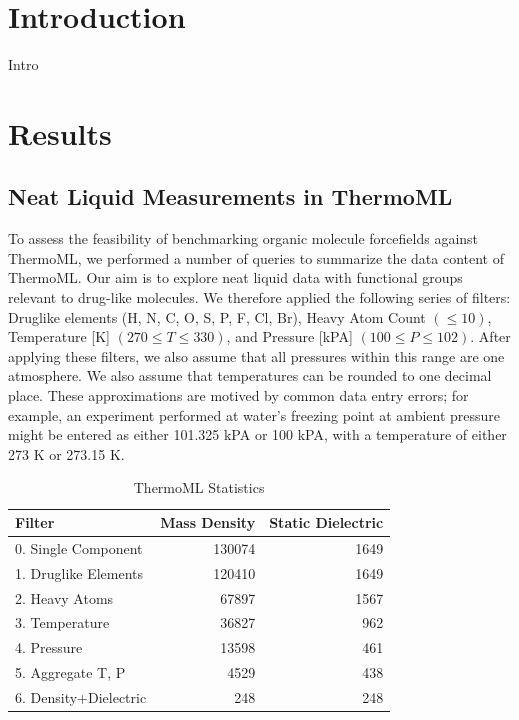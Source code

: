 \documentclass[aps,pre,twocolumn,superscriptaddress]{revtex4-1}
\begin{document}
\section{Introduction}

Intro

\section{Results}

\subsection{Neat Liquid Measurements in ThermoML}

To assess the feasibility of benchmarking organic molecule forcefields against ThermoML, we performed a number of queries to summarize the data content of ThermoML.  Our aim is to explore neat liquid data with functional groups relevant to drug-like molecules.  We therefore applied the following series of filters: Druglike elements (H, N, C, O, S, P, F, Cl, Br), Heavy Atom Count $(\le 10)$, Temperature [K] $(270 \le T \le 330)$, and Pressure [kPA] $(100 \le P \le 102)$.  After applying these filters, we also assume that all pressures within this range are one atmosphere.  We also assume that temperatures can be rounded to one decimal place.  These approximations are motived by common data entry errors; for example, an experiment performed at water's freezing point at ambient pressure might be entered as either 101.325 kPA or 100 kPA, with a temperature of either 273 K or 273.15 K.

\begin{table}
\begin{tabular}{lrr}
\toprule
Filter &  Mass Density &  Static Dielectric \\
\midrule
0.  Single Component   &               130074 &                                     1649 \\
1.  Druglike Elements  &               120410 &                                     1649 \\
2.  Heavy Atoms        &                67897 &                                     1567 \\
3.  Temperature        &                36827 &                                      962 \\
4.  Pressure           &                13598 &                                      461 \\
5.  Aggregate T, P     &                 4529 &                                      438 \\
6.  Density+Dielectric &                  248 &                                      248 \\
\bottomrule
\end{tabular}
\label{Table:Measurements}
\caption{ThermoML Statistics}
\end{table}
\end{document}
